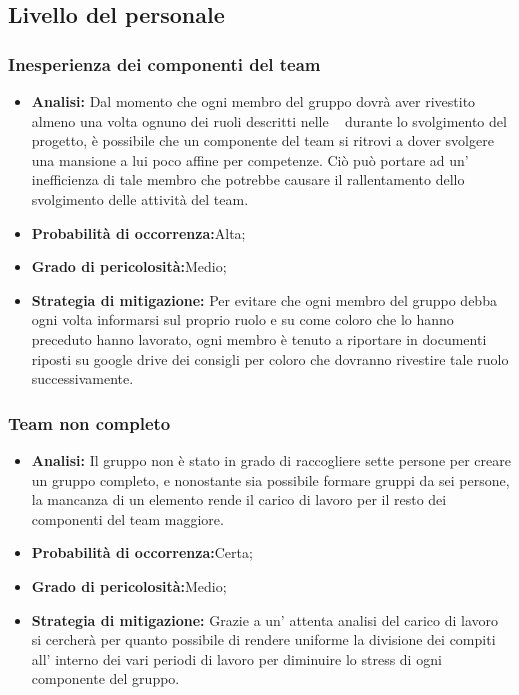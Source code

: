 \subsection{Livello del personale}
\subsubsection{Inesperienza dei componenti del team}
	\begin{itemize}
	\item \textbf{Analisi: }Dal momento che ogni membro del gruppo dovrà aver rivestito almeno una volta  ognuno dei ruoli descritti nelle \infoNDP~ durante lo svolgimento del progetto, è possibile che un componente del team si ritrovi a dover svolgere una mansione a lui poco affine per competenze. Ciò può portare ad un' inefficienza di tale membro che potrebbe causare il rallentamento dello svolgimento delle attività del team.
	\item \textbf{Probabilità di occorrenza:}Alta;
	\item \textbf{Grado di pericolosità:}Medio;
	\item \textbf{Strategia di mitigazione: }Per evitare che ogni membro del gruppo debba ogni volta informarsi sul proprio ruolo e su come coloro che lo hanno preceduto hanno lavorato, ogni membro è  tenuto a riportare in documenti riposti su google drive dei consigli per coloro che dovranno rivestire tale ruolo successivamente.
	\end{itemize}
\subsubsection{Team non completo}
	\begin{itemize}
	\item \textbf{Analisi: }Il gruppo non è stato in grado di raccogliere sette persone per creare un gruppo completo, e nonostante sia possibile formare gruppi da sei persone, la mancanza di un elemento rende il carico di lavoro per il resto dei componenti del team maggiore.
	\item \textbf{Probabilità di occorrenza:}Certa;
	\item \textbf{Grado di pericolosità:}Medio;
	\item \textbf{Strategia di mitigazione: }Grazie a un' attenta analisi del carico di lavoro si cercherà per quanto possibile di rendere uniforme la divisione dei compiti all' interno dei vari periodi di lavoro per diminuire lo stress di ogni componente del gruppo.
	\end{itemize}
